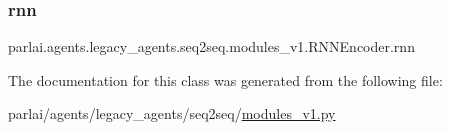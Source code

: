 \subsubsection{\texorpdfstring{rnn}{rnn}}
{\footnotesize\ttfamily parlai.\+agents.\+legacy\+\_\+agents.\+seq2seq.\+modules\+\_\+v1.\+R\+N\+N\+Encoder.\+rnn}



The documentation for this class was generated from the following file\+:\begin{DoxyCompactItemize}
\item 
parlai/agents/legacy\+\_\+agents/seq2seq/\hyperlink{modules__v1_8py}{modules\+\_\+v1.\+py}\end{DoxyCompactItemize}
